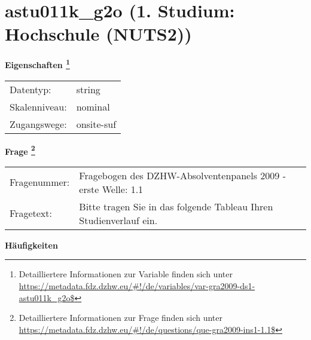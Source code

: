 
    \setcounter{footnote}{0}

    \vspace*{-1.8cm}
	\section{astu011k\_g2o (1. Studium: Hochschule (NUTS2))}
	\label{section:astu011k_g2o}



    \vspace*{0.5cm}
    \noindent\textbf{Eigenschaften
	\footnote{Detailliertere Informationen zur Variable finden sich unter
		\url{https://metadata.fdz.dzhw.eu/\#!/de/variables/var-gra2009-ds1-astu011k_g2o$}}}\\
	\begin{tabularx}{\hsize}{@{}lX}
	Datentyp: & string \\
	Skalenniveau: & nominal \\
	Zugangswege: &
	  onsite-suf
 \\
    \end{tabularx}



				\vspace*{0.5cm}
                \noindent\textbf{Frage
	                \footnote{Detailliertere Informationen zur Frage finden sich unter
		              \url{https://metadata.fdz.dzhw.eu/\#!/de/questions/que-gra2009-ins1-1.1$}}}\\
				\begin{tabularx}{\hsize}{@{}lX}
					Fragenummer: &
					  Fragebogen des DZHW-Absolventenpanels 2009 - erste Welle:
					  1.1
 \\
					Fragetext: & Bitte tragen Sie in das folgende Tableau Ihren Studienverlauf ein. \\
				\end{tabularx}





        		\vspace*{0.5cm}
                \noindent\textbf{Häufigkeiten}


